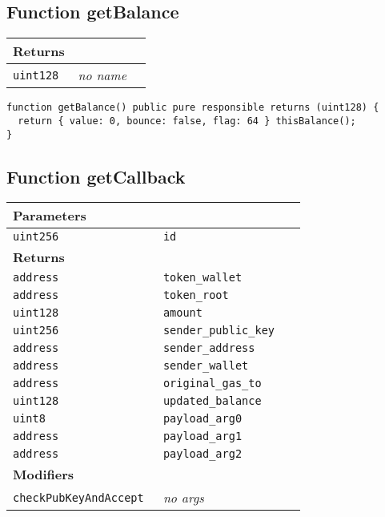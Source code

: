 \subsection{Function getBalance}


\ifsoltables
\noindent\begin{tabular}{|l|l|p{5cm}|}\hline
\multicolumn{3}{|l|}{\bf Returns}\\\hline
\tt uint128 & {\em no name} &\\\hline
\end{tabular}
\fi

\vspace{2cm}

\begin{lstlisting}[firstnumber=604]
function getBalance() public pure responsible returns (uint128) {
  return { value: 0, bounce: false, flag: 64 } thisBalance();
}
\end{lstlisting}

\subsection{Function getCallback}


\ifsoltables
\noindent\begin{tabular}{|l|l|p{5cm}|}\hline
\multicolumn{3}{|l|}{\bf Parameters}\\\hline
\tt uint256 & \tt id &\\\hline
\multicolumn{3}{|l|}{\bf Returns}\\\hline
\tt address & \tt token\_{}wallet &\\\hline
\tt address & \tt token\_{}root &\\\hline
\tt uint128 & \tt amount &\\\hline
\tt uint256 & \tt sender\_{}public\_{}key &\\\hline
\tt address & \tt sender\_{}address &\\\hline
\tt address & \tt sender\_{}wallet &\\\hline
\tt address & \tt original\_{}gas\_{}to &\\\hline
\tt uint128 & \tt updated\_{}balance &\\\hline
\tt uint8 & \tt payload\_{}arg0 &\\\hline
\tt address & \tt payload\_{}arg1 &\\\hline
\tt address & \tt payload\_{}arg2 &\\\hline
\multicolumn{3}{|l|}{\bf Modifiers}\\\hline
\tt checkPubKeyAndAccept & {\em no args} &\\\hline
\end{tabular}
\fi

